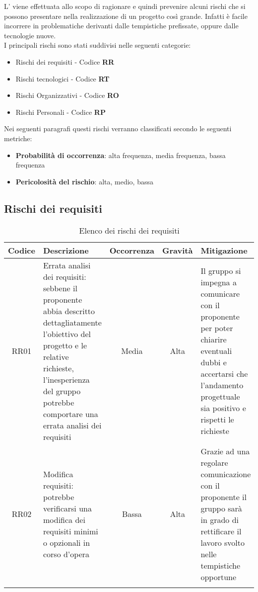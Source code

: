 \documentclass[../piano_di_progetto.tex]{subfiles}
\begin{document}
L’  viene effettuata allo scopo di ragionare e quindi prevenire alcuni rischi che si possono presentare nella realizzazione di un progetto così grande. Infatti è facile incorrere in problematiche derivanti dalle tempistiche prefissate, oppure dalle tecnologie nuove.\\
I principali rischi sono stati suddivisi nelle seguenti categorie:
\begin{itemize}
	\item Rischi dei requisiti - Codice \textbf{RR}
	\item Rischi tecnologici  - Codice \textbf{RT}
	\item Rischi Organizzativi - Codice \textbf{RO}
	\item Rischi Personali - Codice \textbf{RP}
\end{itemize}
Nei seguenti paragrafi questi rischi verranno classificati secondo le seguenti metriche:
\begin{itemize}
	\item \textbf{Probabilità di occorrenza}: alta frequenza, media frequenza, bassa frequenza
	\item \textbf{Pericolosità del rischio}: alta, medio, bassa
\end{itemize}

\subsection{Rischi dei requisiti}%
\label{sub:rischi_req}

\begin{center}
	\begin{longtable}{|c|p{4.5cm}|c|c|p{4.5cm}|}
		\hline
		\rowcolor{lightgray}
		{\textbf{Codice}} & {\textbf{Descrizione}} & {\textbf{Occorrenza}} & {\textbf{Gravità}} & {\textbf{Mitigazione}}                                                     \\

		\hline
		RR01              &
		Errata analisi dei requisiti: sebbene il proponente abbia descritto dettagliatamente l’obiettivo del progetto e le relative richieste, l’inesperienza del gruppo potrebbe comportare una errata analisi dei requisiti
		                  &
		Media
		                  &
		Alta
		                  &
		Il gruppo si impegna a comunicare con il proponente per poter chiarire eventuali dubbi e accertarsi che l’andamento progettuale sia positivo e rispetti le richieste \\

		RR02              &
		Modifica requisiti: potrebbe verificarsi una modifica dei requisiti minimi o opzionali in corso d’opera
		                  &
		Bassa
		                  &
		Alta
		                  &
		Grazie ad una regolare comunicazione con il proponente il gruppo sarà in grado di rettificare il lavoro svolto nelle tempistiche opportune                           \\
		\hline
		\rowcolor{white}
		\caption{Elenco dei rischi dei requisiti}
	\end{longtable}

\end{center}
\end{document}
